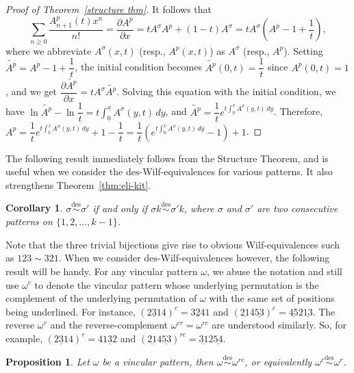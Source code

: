 \documentclass[11pt,reqno]{amsart}
\numberwithin{equation}{section}
\theoremstyle{plain}
\newtheorem{corollary}[theorem]{Corollary}
\newtheorem{proposition}[theorem]{Proposition}
\theoremstyle{definition}
\def\des{\mathrm{des}}
\begin{document}
\begin{proof}[Proof of Theorem~\ref{structure thm}]
    It follows that $$\sum_{n\ge 0}\frac{A_{n+1}^p(t)x^n}{n!}=\frac{{\partial A^p}}{\partial x}=tA^{\sigma}A^p+(1-t)A^{\sigma}=tA^{\sigma}\left(A^p-1+\frac{1}{t}\right),$$
    where we abbreviate $A^{\sigma}(x,t)$ (resp., $A^p(x,t)$) as $A^{\sigma}$ (resp., $A^p$).
    Setting $\widetilde{A^p}=A^{p}-1+\dfrac{1}{t}$, the initial condition becomes $\widetilde{A^p}(0,t)=\dfrac{1}{t}$ since $A^p(0,t)=1$, and 
    we get $\dfrac{\partial \widetilde{A^p}}{\partial x}=tA^{\sigma}\widetilde{A^p}.$
    Solving this equation with the initial condition, we have 
    $\ln \widetilde{A^p}-\ln \dfrac{1}{t}=t \int_{0}^{x} A^{\sigma}(y,t) \,dy$, and 
    $\widetilde{A^p} = \dfrac{1}{t} e^{t \int_{0}^{x} A^{\sigma}(y,t) \,dy}$.
    Therefore, $A^p = \dfrac{1}{t} e^{t \int_{0}^{x} A^{\sigma}(y,t) \,dy} +1-\dfrac{1}{t}=\dfrac{1}{t} (e^{t \int_{0}^{x} A^{\sigma}(y,t) \,dy}-1) +1$.
\end{proof}

The following result immediately follows from the Structure Theorem, and is useful when we consider the $\des$-Wilf-equivalences for various patterns. It also strengthens Theorem~\ref{thm:eli-kit}.

\begin{corollary}\label{col:structure}
    $\sigma\overset{\des}{\sim}\sigma'$ if and only if $\sigma k\overset{\des}{\sim}\sigma' k$, where $\sigma$ and $\sigma'$ are two consecutive patterns on $\{1,2,\ldots,k-1\}$.
\end{corollary}

Note that the three trivial bijections give rise to obvious Wilf-equivalences such as $123\sim 321$. When we consider $\des$-Wilf-equivalences however, the following result will be handy. For any vincular pattern $\omega$, we abuse the notation and still use $\omega^c$ to denote the vincular pattern whose underlying permutation is the complement of the underlying permutation of $\omega$ with the same set of positions being underlined. For instance, $(\underline{231}4 )^c=\underline{324}1$ and $(\underline{21}4\underline{53})^c=\underline{45}2\underline{13}$. The reverse $\omega^r$ and the reverse-complement $\omega^{cr}=\omega^{rc}$ are understood similarly. So, for example,  $(\underline{231}4 )^r=4\underline{132}$ and $(\underline{21}4\underline{53})^{rc}=\underline{31}2\underline{54}$.

\begin{proposition} \label{omega--omega^rc}
    Let $\omega$ be a vincular pattern, then $\omega \overset{\des}{\sim} \omega^{rc}$, or equivalently $\omega^c \overset{\des}{\sim} \omega^{r}$.
\end{proposition}
\end{document}
